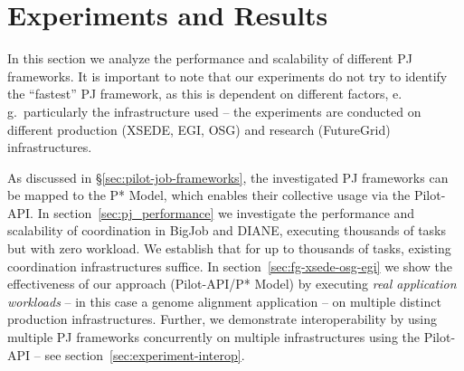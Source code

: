 \documentclass{sig-alternate}
\begin{document}


\section{Experiments and Results}
\label{sec:exp_res}


In this section we analyze the performance and scalability of
different PJ frameworks.  It is important to note that our experiments
do not try to identify the ``fastest'' PJ framework, as
this is dependent on different factors, e.\,g.\ particularly the
infrastructure used -- the experiments are conducted on different
production (XSEDE, EGI, OSG) and research (FutureGrid) infrastructures. 

As discussed in \S\ref{sec:pilot-job-frameworks}, the investigated PJ
frameworks can be mapped to the P* Model, which enables their
collective usage via the Pilot-API. In
section~\ref{sec:pj_performance} we investigate the performance and
scalability of coordination in BigJob and DIANE, executing thousands
of tasks but with zero workload. We establish that for up to thousands
of tasks, existing coordination infrastructures suffice.  In
section~\ref{sec:fg-xsede-osg-egi} we show the effectiveness of our
approach (Pilot-API/P* Model) by executing {\it real application
  workloads} -- in this case a genome alignment application -- on
multiple distinct production infrastructures. Further, we demonstrate
interoperability by using multiple PJ frameworks concurrently on
multiple infrastructures using the Pilot-API -- see
section~\ref{sec:experiment-interop}.



\end{document}

